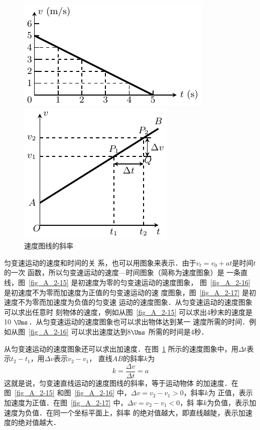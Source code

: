 \begin{figure}[htp]
    \centering
    \begin{minipage}[t]{0.48\textwidth}
        \centering
        \includegraphics{fig/A/2-17.pdf}
        \caption{$v_0=5 \Ums $，$  a=-1 \Umsq $}\label{fig_A_2-17}
    \end{minipage}
    \begin{minipage}[t]{0.48\textwidth}
        \centering
        \includegraphics{fig/A/2-18.pdf}
        \caption{速度图线的斜率}\label{fig_A_2-18}
    \end{minipage}
\end{figure}

匀变速运动的速度和时间的关
系，也可以用图象来表示．由于$v_t=v_0+at$是时间$t$的一次
函数，所以匀变速运动的速度—时间图象（简称为速度图象）是
一条直线，图~\ref{fig_A_2-15} 是初速度为零的匀变速运动的速度图象，
图~\ref{fig_A_2-16} 是初速度不为零而加速度为正值的匀变速运动的速
度图象，图~\ref{fig_A_2-17} 是初速度不为零而加速度为负值的匀变速
运动的速度图象．从匀变速运动的速度图象可以求出任意时
刻物体的速度，例如从图~\ref{fig_A_2-15} 可以求出4秒末的速度是10
$\Ums$．从匀变速运动的速度图象也可以求出物体达到某一
速度所需的时间．例如从图~\ref{fig_A_2-16} 可以求出速度达到8$\Ums$
所需的时间是4秒．


    从匀变速运动的速度图象还可以求出加速度．在图~\ref{fig_A_2-18} 所示的速度图象中，用$\Delta t$表示$t_2-t_1$，用$\Delta v$表示$v_2-v_1$，
直线$AB$的斜率$k$为
\[k=\frac{\Delta v}{\Delta t}=a \]
这就是说，匀变速直线运动的速度图线的斜率，等于运动物体
的加速度．在图~\ref{fig_A_2-15} 和图~\ref{fig_A_2-16} 中，$\Delta v=v_2-v_1>0$，斜率$k$为
正值，表示加速度为正值．在图~\ref{fig_A_2-17} 中，$\Delta v=v_2-v_1<0$，斜
率$k$为负值，表示加速度为负值．在同一个坐标平面上，斜率
的绝对值越大，即直线越陡，表示加速度的绝对值越大．

